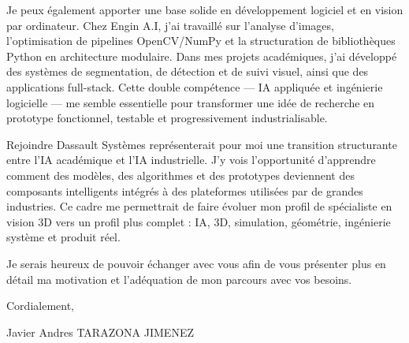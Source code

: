 \documentclass[10pt,a4paper]{article}
\begin{document}
{Je peux également apporter une base solide en développement logiciel et en vision par ordinateur. Chez Engin A.I, j’ai travaillé sur l’analyse d’images, l’optimisation de pipelines OpenCV/NumPy et la structuration de bibliothèques Python en architecture modulaire. Dans mes projets académiques, j’ai développé des systèmes de segmentation, de détection et de suivi visuel, ainsi que des applications full-stack. Cette double compétence — IA appliquée et ingénierie logicielle — me semble essentielle pour transformer une idée de recherche en prototype fonctionnel, testable et progressivement industrialisable.

Rejoindre Dassault Systèmes représenterait pour moi une transition structurante entre l’IA académique et l’IA industrielle. J’y vois l’opportunité d’apprendre comment des modèles, des algorithmes et des prototypes deviennent des composants intelligents intégrés à des plateformes utilisées par de grandes industries. Ce cadre me permettrait de faire évoluer mon profil de spécialiste en vision 3D vers un profil plus complet : IA, 3D, simulation, géométrie, ingénierie système et produit réel.

Je serais heureux de pouvoir échanger avec vous afin de vous présenter plus en détail ma motivation et l’adéquation de mon parcours avec vos besoins.

Cordialement,

Javier Andres TARAZONA JIMENEZ


}
\end{document}
